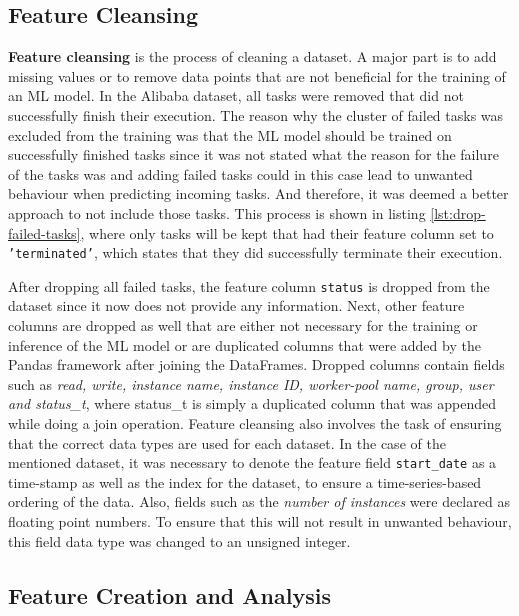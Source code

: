   \subsection{Feature Cleansing}
  \label{sec:feature-cleansing-preprocessing-architecture}

    \textbf{Feature cleansing} is the process of cleaning a dataset. 
    A major part is to add missing values or to remove data points that are not beneficial for the training of an ML model. 
    In the Alibaba dataset, all tasks were removed that did not successfully finish their execution. The reason why the cluster of failed tasks was excluded from the training was that the ML model should be trained on successfully finished tasks since it was not stated what the reason for the failure of the tasks was and adding failed tasks could in this case lead to unwanted behaviour when predicting incoming tasks. And therefore, it was deemed a better approach to not include those tasks. 
    This process is shown in listing \ref{lst:drop-failed-tasks}, where only tasks will be kept that had their feature column set to \texttt{'terminated'}, which states that they did successfully terminate their execution.
    
    After dropping all failed tasks, the feature column \texttt{status} is dropped from the dataset since it now does not provide any information.
    Next, other feature columns are dropped as well that are either not necessary for the training or inference of the ML model or are duplicated columns that were added by the Pandas framework after joining the DataFrames. Dropped columns contain fields such as \emph{read, write, instance name, instance ID, worker-pool name, group, user and status\_t}, where status\_t is simply a duplicated column that was appended while doing a join operation. Feature cleansing also involves the task of ensuring that the correct data types are used for each dataset. In the case of the mentioned dataset, it was necessary to denote the feature field \texttt{start\_date} as a time-stamp as well as the index for the dataset, to ensure a time-series-based ordering of the data. Also, fields such as the \emph{number of instances} were declared as floating point numbers. To ensure that this will not result in unwanted behaviour, this field data type was changed to an unsigned integer.

  \subsection{Feature Creation and Analysis}
  \label{sec:feature-creation-analysis-preprocessing-architecture}

